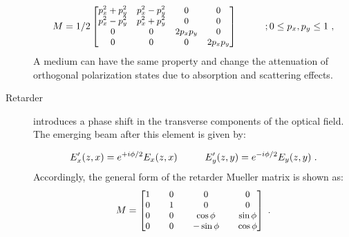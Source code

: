 \begin{description}
\begin{equation}\label{Eq:GenPolMul}
\small
	M = 1/2 
	\begin{bmatrix}
	p_{x}^{2}+p_{y}^{2} & p_{x}^{2}-p_{y}^{2} & 0 & 0\\ p_{x}^{2}-p_{y}^{2} & p_{x}^{2}+p_{y}^{2} & 0 & 0\\0 & 0 & 2p_{x}p_{y} & 0\\0 & 0 & 0 & 2p_{x}p_{y}\\
	\end{bmatrix}   \hspace{1cm} ; 0 \leq p_{x}, p_{y}\leq 1~,
\end{equation}
A medium can have the same property and change the attenuation of orthogonal polarization states due to absorption and scattering effects.
\item [Retarder] introduces a phase shift in the transverse components of the optical field.
The emerging beam after this element is given by: 
 
\begin{equation}\label{Eq:Ret}
\small
	E_{x}'(z,x) = e^{+i\phi/2}E_{x}(z,x)   \hspace{1 cm}	E_{y}'(z,y) = e^{-i\phi/2}E_{y}(z,y)~.
\end{equation}
\noindent Accordingly, the general form of the retarder Mueller matrix is shown as:
\begin{equation}\label{Eq:GenRetMul}
\small
	M = 
	\begin{bmatrix}
	1   & & 0  & & 0  & & 0\\ 0   & & 1  & & 0  & & 0\\0  & & 0  & & \cos\phi  & & \sin\phi\\0  & & 0  & & -\sin\phi  & &\cos\phi\\
	\end{bmatrix}~.
\end{equation}


\end{description}

